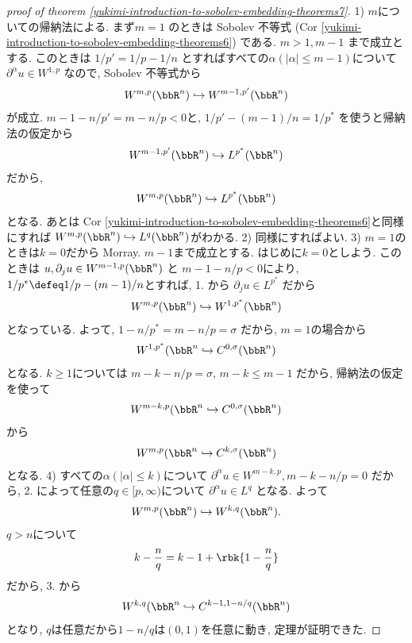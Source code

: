 \documentclass[openany, a4paper, oneside]{jsbook}
\begin{document}
\begin{proof}[proof of theorem \ref{yukimi-introduction-to-sobolev-embedding-theorems7}]
1) $m$についての帰納法による.
   まず$m = 1$ のときは Sobolev 不等式 (Cor \ref{yukimi-introduction-to-sobolev-embedding-theorems6}) である.
   $m > 1, m-1$ まで成立とする.
   このときは $1/{p'} = 1/p - 1/n$ とすればすべての$\alpha (|\alpha| \le m-1)$について
   $\partial^{\alpha} u \in W^{1, p}$ なので, Sobolev 不等式から
   \begin{align}
    W^{m, p}(\bbR^n) \hookrightarrow W^{m-1, p'}(\bbR^n)
   \end{align}
   が成立.
   $m-1 - n/{p'} = m - n/p < 0$と, $1/{p'} - (m-1)/n = 1/{p^*}$ を使うと帰納法の仮定から
   \begin{align}
    W^{m-1, p'}(\bbR^n) \hookrightarrow L^{p^*}(\bbR^n)
   \end{align}
   だから,
   \begin{align}
    W^{m, p}(\bbR^n) \hookrightarrow L^{p^*}(\bbR^n)
   \end{align}
   となる.
   あとは Cor \ref{yukimi-introduction-to-sobolev-embedding-theorems6}と同様にすれば
   $W^{m, p}(\bbR^n) \hookrightarrow L^{q}(\bbR^n)$がわかる.
2) 同様にすればよい.
3) $m = 1$のときは$k = 0$だから Morray.
   $m-1$まで成立とする.
   はじめに$k = 0$としよう.
   このときは $u, \partial_j u \in W^{m-1, p}(\bbR^n)$ と $m-1 - n/p < 0$により,
   $1/{p^*} \defeq 1/p - (m-1)/n$とすれば, 1. から
   $\partial_j u \in L^{p^*}$ だから
   \begin{align}
    W^{m, p}(\bbR^n) \hookrightarrow W^{1, p^*}(\bbR^n)
   \end{align}
   となっている.
   よって, $1 - n/{p^*} = m - n/p = \sigma$ だから, $m = 1$の場合から
   \begin{align}
    W^{1, p^*}(\bbR^n \hookrightarrow C^{0, \sigma}(\bbR^n)
   \end{align}
   となる.
   $k \ge 1$については $m - k - n/p = \sigma$, $m - k \le m -1$ だから,
   帰納法の仮定を使って
   \begin{align}
    W^{m - k, p}(\bbR^n \hookrightarrow C^{0, \sigma}(\bbR^n)
   \end{align}
   から
   \begin{align}
    W^{m, p}(\bbR^n \hookrightarrow C^{k, \sigma}(\bbR^n)
   \end{align}
   となる.
4) すべての$\alpha (|\alpha| \le k)$について
   $\partial^{\alpha}u \in W^{m-k, p}, m-k - n/p =0$ だから, 2. によって任意の$q \in [p, \infty)$について
   $\partial^{\alpha}u \in L^q$ となる.
   よって
   \begin{align}
    W^{m, p}(\bbR^n) \hookrightarrow W^{k, q}(\bbR^n).
   \end{align}
   $q > n$について
   \begin{align}
    k - \frac{n}{q}
    =
    k - 1 + \rbk{1 - \frac{n}{q}}
   \end{align}
   だから, 3. から
   \begin{align}
    W^{k, q}(\bbR^n \hookrightarrow C^{k - 1, 1 - n/q}(\bbR^n)
   \end{align}
   となり, $q$は任意だから$1 - n/q$は$(0, 1)$を任意に動き, 定理が証明できた.
\end{proof}
\end{document}
